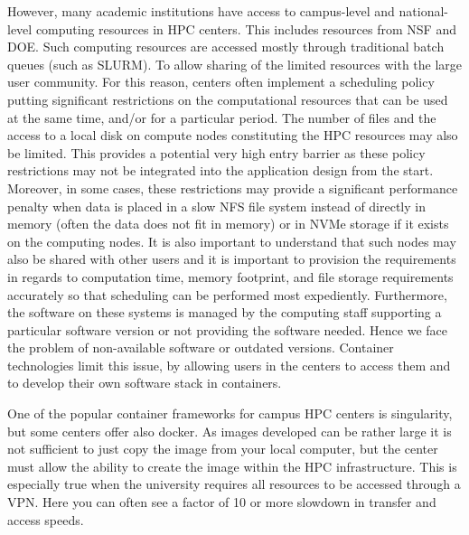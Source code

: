 \documentclass[utf8]{FrontiersinVancouver} %
\begin{document}
However, many academic institutions have access to campus-level and
national-level computing resources in HPC centers.  This includes
resources from NSF and DOE. Such computing resources are accessed
mostly through traditional batch queues (such as SLURM).  To allow
sharing of the limited resources with the large user community. For
this reason, centers often implement a scheduling policy putting
significant restrictions on the computational resources that can be
used at the same time, and/or for a particular period. The number of
files and the access to a local disk on compute nodes constituting the
HPC resources may also be limited.  This provides a potential very
high entry barrier as these policy restrictions may not be integrated
into the application design from the start.  Moreover, in some cases,
these restrictions may provide a significant performance penalty when
data is placed in a slow NFS file system instead of directly in memory
(often the data does not fit in memory) or in NVMe storage if it
exists on the computing nodes.  It is also important to understand
that such nodes may also be shared with other users and it is
important to provision the requirements in regards to computation
time, memory footprint, and file storage requirements accurately so
that scheduling can be performed most expediently.  Furthermore, the
software on these systems is managed by the computing staff supporting
a particular software version or not providing the software
needed. Hence we face the problem of non-available software or
outdated versions. Container technologies limit this issue, by
allowing users in the centers to access them and to develop their own
software stack in containers.
 

One of the popular container frameworks for campus HPC centers is
singularity, but some centers offer also docker.  As images developed
can be rather large it is not sufficient to just copy the image from
your local computer, but the center must allow the ability to create
the image within the HPC infrastructure. This is especially true when
the university requires all resources to be accessed through a
VPN. Here you can often see a factor of 10 or more slowdown in
transfer and access speeds.
\end{document}
